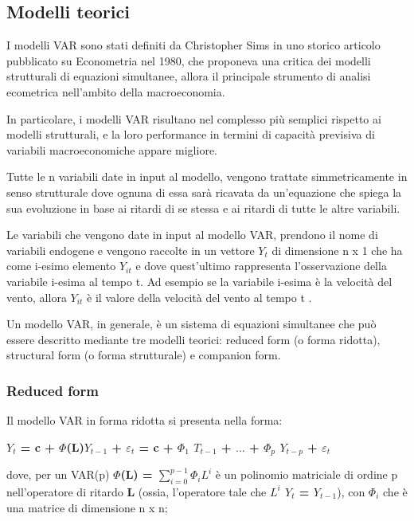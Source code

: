 \documentclass[12pt,a4paper,oneside,openright]{book}
\begin{document}
\subsection{Modelli teorici}
I modelli VAR sono stati definiti da Christopher Sims in uno storico articolo pubblicato su Econometria nel 1980, che proponeva una critica dei modelli strutturali di equazioni simultanee, allora il principale strumento di analisi ecometrica nell'ambito della macroeconomia. 

In particolare, i modelli VAR risultano nel complesso più semplici rispetto ai modelli strutturali, e la loro performance in termini di capacità previsiva di variabili macroeconomiche appare migliore.

Tutte le n variabili date in input al modello, vengono trattate simmetricamente in senso strutturale dove ognuna di essa sarà ricavata da un’equazione che spiega la sua evoluzione in base ai ritardi di se stessa e ai ritardi di tutte le altre variabili. 

Le variabili che vengono date in input al modello VAR, prendono il nome di variabili endogene e vengono raccolte in un vettore $Y_{t}$ di dimensione n x 1 che ha come i-esimo elemento $Y_{it}$ e dove quest’ultimo rappresenta l’osservazione della variabile i-esima al tempo t. Ad esempio se la variabile i-esima è la velocità del vento, allora $Y_{it}$ è il valore della velocità del vento al tempo t \cite{9a} \cite {10a}. 

Un modello VAR, in generale, è un sistema di equazioni simultanee che può essere descritto mediante tre modelli teorici: reduced form (o forma ridotta), structural form (o forma strutturale) e companion form.  
\subsubsection{Reduced form}
Il modello VAR in forma ridotta si presenta nella forma:
\begin{center}
{\bfseries  $Y_{t}$ = c + $\Phi$(L)$Y_{t-1}$ + $\varepsilon_{t}$ = c + $\Phi_{1}$ $T_{t-1}$ + $\dots$ + $\Phi_{p}$ $Y_{t-p}$ + $\varepsilon_{t}$ }
\end{center}

dove, per un  VAR(p) {\bfseries  $\Phi$(L) = $\sum_{i=0}^{p-1}{\Phi_{i} L^{i}}$} è un polinomio matriciale di ordine p nell'operatore di ritardo {\bfseries L} (ossia, l'operatore tale che {\bfseries $L^{i}$ $Y_{t}$ = $Y_{t-1}$}), con {\bfseries $\Phi_{i}$} che è una matrice di dimensione n x n; 
\end{document}
